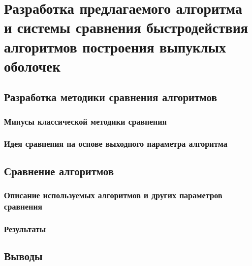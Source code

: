 \chapter{Разработка предлагаемого алгоритма и системы сравнения быстродействия алгоритмов построения выпуклых оболочек} \label{chapt3}

\section{Разработка методики сравнения алгоритмов}

\subsection{Минусы классической методики сравнения}

\subsection{Идея сравнения на основе выходного параметра алгоритма}

\section{Сравнение алгоритмов}

\subsection{Описание используемых алгоритмов и других параметров сравнения}

\subsection{Результаты}

\section{Выводы}
